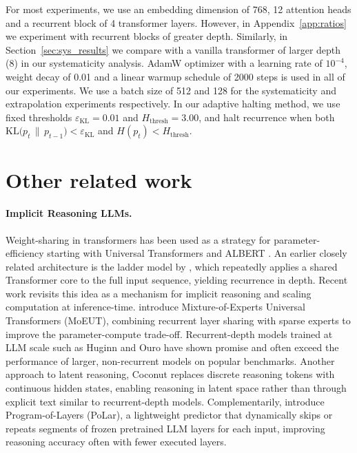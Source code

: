 For most experiments, we use an embedding dimension of 768, 12 attention heads and a recurrent block of 4 transformer layers. However, in Appendix~\ref{app:ratios} we experiment with recurrent blocks of greater depth. Similarly, in Section~\ref{sec:sys_results} we compare with a vanilla transformer of larger depth (8) in our systematicity analysis. AdamW optimizer \citep{loshchilovdecoupled} with a learning rate of $10^{-4}$, weight decay of 0.01 and a linear warmup schedule of 2000 steps is used in all of our experiments. We use a batch size of 512 and 128 for the systematicity and extrapolation experiments respectively. In our adaptive halting method, we use fixed thresholds $\varepsilon_{\mathrm{KL}} = 0.01$ and $H_{\mathrm{thresh}} = 3.00$, and halt recurrence when both $\mathrm{KL}\!\bigl(p_t \,\|\, p_{t-1}\bigr) < \varepsilon_{\mathrm{KL}}$ and $H(p_t) < H_{\mathrm{thresh}}$.

\section{Other related work}\label{app:other_related_work}

\paragraph {Implicit Reasoning LLMs.} Weight-sharing in transformers has been used as a strategy for parameter-efficiency starting with Universal Transformers \citep{dehghani2018universal} and ALBERT \citep{Lan2020ALBERT:}. An earlier closely related architecture is the ladder model by \citet{ju2022staircase}, which repeatedly applies a shared Transformer core to the full input sequence, yielding recurrence in depth. Recent work revisits this idea as a mechanism for implicit reasoning and scaling computation at inference-time. \citet{csordas2024moeut} introduce Mixture-of-Experts Universal Transformers (MoEUT), combining recurrent layer sharing with sparse experts to improve the parameter-compute trade-off. Recurrent-depth models trained at LLM scale such as Huginn \citep{geiping2025scaling} and Ouro \citep{zhu2025scaling} have shown promise and often exceed the performance of larger, non-recurrent models on popular benchmarks. Another approach to latent reasoning, Coconut \citep{hao2025training} replaces discrete reasoning tokens with continuous hidden states, enabling reasoning in latent space rather than through explicit text similar to recurrent-depth models. Complementarily, \citet{li2026polar} introduce Program-of-Layers (PoLar), a lightweight predictor that dynamically skips or repeats segments of frozen pretrained LLM layers for each input, improving reasoning accuracy often with fewer executed layers.

